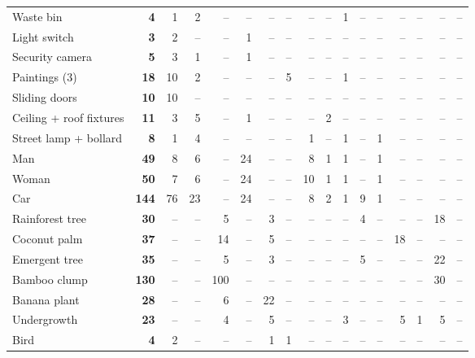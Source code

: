 \begin{tabular}{@{}l r rrrrrrrrrrrrrrr@{}}
Waste bin & \textbf{4} & 1 & 2 & -- & -- & -- & -- & -- & -- & 1 & -- & -- & -- & -- & -- & -- \\
Light switch & \textbf{3} & 2 & -- & -- & 1 & -- & -- & -- & -- & -- & -- & -- & -- & -- & -- & -- \\
Security camera & \textbf{5} & 3 & 1 & -- & 1 & -- & -- & -- & -- & -- & -- & -- & -- & -- & -- & -- \\
Paintings (3) & \textbf{18} & 10 & 2 & -- & -- & -- & 5 & -- & -- & 1 & -- & -- & -- & -- & -- & -- \\
Sliding doors & \textbf{10} & 10 & -- & -- & -- & -- & -- & -- & -- & -- & -- & -- & -- & -- & -- & -- \\
Ceiling + roof fixtures & \textbf{11} & 3 & 5 & -- & 1 & -- & -- & -- & 2 & -- & -- & -- & -- & -- & -- & -- \\
Street lamp + bollard & \textbf{8} & 1 & 4 & -- & -- & -- & -- & 1 & -- & 1 & -- & 1 & -- & -- & -- & -- \\
Man & \textbf{49} & 8 & 6 & -- & 24 & -- & -- & 8 & 1 & 1 & -- & 1 & -- & -- & -- & -- \\
Woman & \textbf{50} & 7 & 6 & -- & 24 & -- & -- & 10 & 1 & 1 & -- & 1 & -- & -- & -- & -- \\
Car & \textbf{144} & 76 & 23 & -- & 24 & -- & -- & 8 & 2 & 1 & 9 & 1 & -- & -- & -- & -- \\
Rainforest tree & \textbf{30} & -- & -- & 5 & -- & 3 & -- & -- & -- & -- & 4 & -- & -- & -- & 18 & -- \\
Coconut palm & \textbf{37} & -- & -- & 14 & -- & 5 & -- & -- & -- & -- & -- & -- & 18 & -- & -- & -- \\
Emergent tree & \textbf{35} & -- & -- & 5 & -- & 3 & -- & -- & -- & -- & 5 & -- & -- & -- & 22 & -- \\
Bamboo clump & \textbf{130} & -- & -- & 100 & -- & -- & -- & -- & -- & -- & -- & -- & -- & -- & 30 & -- \\
Banana plant & \textbf{28} & -- & -- & 6 & -- & 22 & -- & -- & -- & -- & -- & -- & -- & -- & -- & -- \\
Undergrowth & \textbf{23} & -- & -- & 4 & -- & 5 & -- & -- & -- & 3 & -- & -- & 5 & 1 & 5 & -- \\
Bird & \textbf{4} & 2 & -- & -- & -- & 1 & 1 & -- & -- & -- & -- & -- & -- & -- & -- & -- \\
\bottomrule
\end{tabular}
